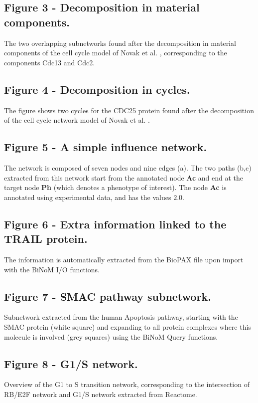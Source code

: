 \documentclass[10pt]{bmc_article}
\newenvironment{bmcformat}{\baselineskip20pt\sloppy\setboolean{publ}{false}}{\baselineskip20pt\sloppy}
\begin{document}
\begin{bmcformat}
  \subsection*{Figure 3 - Decomposition in material components.}
The two overlapping subnetworks found after the decomposition in material components of the cell cycle model of Novak et al. \cite{novak1998model}, corresponding to the components Cdc13 and
Cdc2.

  \subsection*{Figure 4 - Decomposition in cycles.}
The figure shows two cycles for the CDC25 protein found after the decomposition of the cell cycle network model of Novak et al. \cite{novak1998model}.

  \subsection*{Figure 5 - A simple influence network.}
The network is composed of seven nodes and nine edges (a). The two paths (b,c)
extracted from this network start from the annotated node \textbf{Ac} and end at
the target node \textbf{Ph} (which denotes a phenotype of interest). The node
\textbf{Ac} is annotated using experimental data, and has the
values $2.0$.

  \subsection*{Figure 6 - Extra information linked to the TRAIL protein.}
The information is automatically extracted from the BioPAX file upon
import with the BiNoM I/O functions.

  \subsection*{Figure 7 - SMAC pathway subnetwork.}
Subnetwork extracted from the human Apoptosis pathway, starting with the
SMAC protein (white square) and expanding to all protein complexes where this
molecule is involved (grey squares) using the BiNoM Query functions.

  \subsection*{Figure 8 - G1/S network.}
Overview of the G1 to S transition network, corresponding to the intersection of
RB/E2F network and G1/S network extracted from Reactome.


\end{bmcformat}
\end{document}
